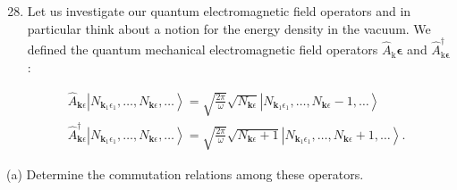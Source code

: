 \documentclass[12pt]{article}
\begin{document}
\section{}
\begin{enumerate}
  \setcounter{enumi}{27}
  \item Let us investigate our quantum electromagnetic field operators and in particular think about a notion for the energy density in the vacuum. We defined the quantum mechanical electromagnetic field operators $\hat{A}_{\mathrm{k}} \boldsymbol{\epsilon}$ and $\hat{A}_{\mathrm{k} \boldsymbol{\epsilon}}^{\dagger}$ :
\end{enumerate}


\begin{align*}
& \hat{A}_{\mathbf{k} \epsilon}\left|N_{\mathbf{k}_{1} \epsilon_{1}}, \ldots, N_{\mathbf{k} \epsilon}, \ldots\right\rangle=\sqrt{\frac{2 \pi}{\omega}} \sqrt{N_{\mathbf{k} \epsilon}}\left|N_{\mathbf{k}_{1} \epsilon_{1}}, \ldots, N_{\mathbf{k} \epsilon}-1, \ldots\right\rangle  \tag{5}\\
& \hat{A}_{\mathbf{k} \epsilon}^{\dagger}\left|N_{\mathbf{k}_{1} \epsilon_{1}}, \ldots, N_{\mathbf{k} \epsilon}, \ldots\right\rangle=\sqrt{\frac{2 \pi}{\omega}} \sqrt{N_{\mathbf{k} \epsilon}+1}\left|N_{\mathbf{k}_{1} \epsilon_{1}}, \ldots, N_{\mathbf{k} \epsilon}+1, \ldots\right\rangle . \tag{6}
\end{align*}


(a) Determine the commutation relations among these operators.
\end{document}
